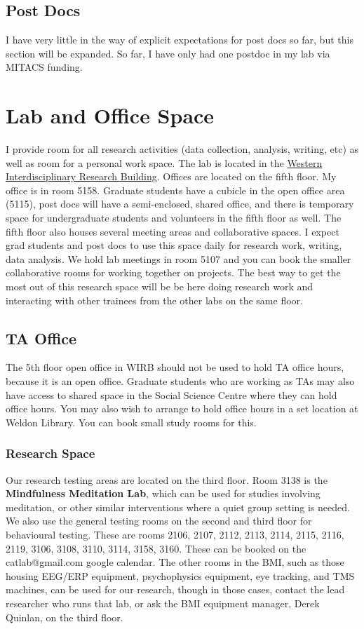 \documentclass{article}
\begin{document}
\subsection {Post Docs}
I have very little in the way of explicit expectations for post docs so far, but this section will be expanded. So far, I have only had one postdoc in my lab via MITACS funding. 


\section {Lab and Office Space}
I provide room for all research activities (data collection, analysis, writing, etc) as well as room for a personal work space. The lab is located in the \href{http://www.uwo.ca/bmi/about/wirb.html}{Western Interdisciplinary Research Building}. Offices are located on the fifth floor. My office is in room 5158. Graduate students have a cubicle in the open office area (5115), post docs will have a semi-enclosed, shared office, and there is temporary space for undergraduate students and volunteers in the fifth floor as well. The fifth floor also houses several meeting areas and collaborative spaces. I expect grad students and post docs to use this space daily for research work, writing, data analysis. We hold lab meetings in room 5107 and you can book the smaller collaborative rooms for working together on projects. The best way to get the most out of this research space will be be here doing research work and interacting with other trainees from the other labs on the same floor. 

\subsection{TA Office}
The 5th floor open office in WIRB should not be used to hold TA office hours, because it is an open office. Graduate students who are working as TAs may also have access to shared space in the Social Science Centre where they can hold office hours. You may also wish to arrange to hold office hours in a set location at Weldon Library. You can book small study rooms for this. 

\subsubsection{Research Space} 
Our research testing areas are located on the third floor. Room 3138 is the \textbf{Mindfulness Meditation Lab}, which can be used for studies involving meditation, or other similar interventions where a quiet group setting is needed. We also use the general testing rooms on the second and third floor for behavioural testing. These are rooms 2106, 2107, 2112, 2113, 2114, 2115, 2116, 2119, 3106, 3108, 3110, 3114, 3158, 3160. These can be booked on the catlab@gmail.com google calendar. The other rooms in the BMI, such as those housing EEG/ERP equipment, psychophysics equipment, eye tracking, and TMS machines, can be used for our research, though in those cases, contact the lead researcher who runs that lab, or ask the BMI equipment manager, Derek Quinlan, on the third floor. 
\end{document}
